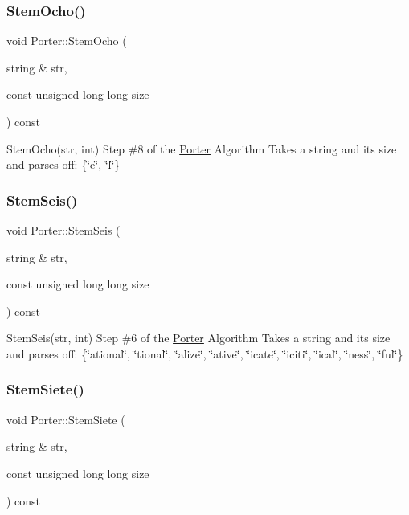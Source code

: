 \subsubsection{\texorpdfstring{Stem\+Ocho()}{StemOcho()}}
{\footnotesize\ttfamily void Porter\+::\+Stem\+Ocho (\begin{DoxyParamCaption}\item[{string \&}]{str,  }\item[{const unsigned long long}]{size }\end{DoxyParamCaption}) const}

Stem\+Ocho(str, int) Step \#8 of the \hyperlink{classPorter}{Porter} Algorithm Takes a string and its size and parses off\+: \{\char`\"{}e\char`\"{}, \char`\"{}l\char`\"{}\} \mbox{\label{classPorter_a485f69d6797fce65144e0596f3190c2d}} 
\subsubsection{\texorpdfstring{Stem\+Seis()}{StemSeis()}}
{\footnotesize\ttfamily void Porter\+::\+Stem\+Seis (\begin{DoxyParamCaption}\item[{string \&}]{str,  }\item[{const unsigned long long}]{size }\end{DoxyParamCaption}) const}

Stem\+Seis(str, int) Step \#6 of the \hyperlink{classPorter}{Porter} Algorithm Takes a string and its size and parses off\+: \{\char`\"{}ational\char`\"{}, \char`\"{}tional\char`\"{}, \char`\"{}alize\char`\"{}, \char`\"{}ative\char`\"{}, \char`\"{}icate\char`\"{}, \char`\"{}iciti\char`\"{}, \char`\"{}ical\char`\"{}, \char`\"{}ness\char`\"{}, \char`\"{}ful\char`\"{}\} \mbox{\label{classPorter_a1015f959403c55d740fff435f0cae439}} 
\subsubsection{\texorpdfstring{Stem\+Siete()}{StemSiete()}}
{\footnotesize\ttfamily void Porter\+::\+Stem\+Siete (\begin{DoxyParamCaption}\item[{string \&}]{str,  }\item[{const unsigned long long}]{size }\end{DoxyParamCaption}) const}

